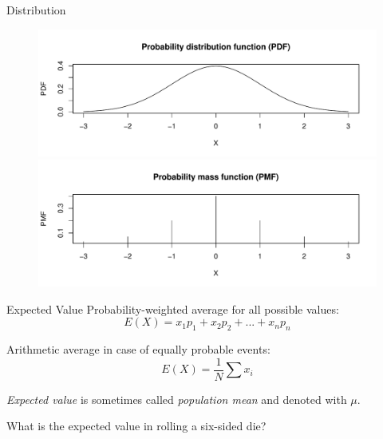 \begin{frame}{Distribution}
    \begin{figure}
        \includegraphics[width=\textwidth]{R/plots/pdf}\\
        \includegraphics[width=\textwidth]{R/plots/pmf}
    \end{figure}
\end{frame}


\begin{frame}{Expected Value}
    Probability-weighted average for all possible values:
    \begin{equation}
        E(X) = x_1 p_1 + x_2 p_2 + ... + x_n p_n
    \end{equation}
    
    Arithmetic average in case of equally probable events:
    \begin{equation}
    E(X) = \frac{1}{N} \sum x_i
    \end{equation}
    
    \emph{Expected value} is sometimes called \emph{population mean} and denoted with $\mu$.
    
    \begin{example}
        \medskip
        What is the expected value in rolling a six-sided die?
    \end{example}
\end{frame}

